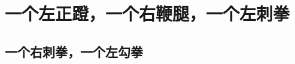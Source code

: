 \documentclass[hyperref, UTF8, CJK]{beamer}
\begin{document}
\makeatletter
\def\beamer@scu@Miniframes{follow}
\makeatother

\section{一个左正蹬，一个右鞭腿，一个左刺拳}
\subsection{一个右刺拳，一个左勾拳}
\begin{frame}
\end{frame}
\begin{frame}
\end{frame}
\makeatletter
\def\beamer@scu@Miniframes{separate}
\makeatother
\begin{frame}
\end{frame}
\begin{frame}
\end{frame}
\makeatletter
\def\beamer@scu@Miniframes{follow}
\makeatother
\begin{frame}
\end{frame}
\begin{frame}
\end{frame}
\end{document}
